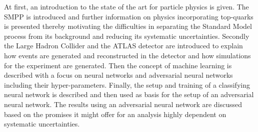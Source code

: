 At first, an introduction to the state of the art for particle physics is given. The SMPP is introduced and further information on physics incorporating top-quarks is presented thereby motivating the difficulties in separating the Standard Model process from its background and reducing its systematic uncertainties.
Secondly the Large Hadron Collider and the ATLAS detector are introduced to explain how events are generated and reconstructed in the detector and how simulations for the experiment are generated.
Then the concept of machine learning is described with a focus on neural networks and adversarial neural networks including their hyper-parameters.
Finally, the setup and training of a classifying neural network is described and then used as basis for the setup of an adversarial neural network.
The results using an adversarial neural network are discussed based on the promises it might offer for an analysis highly dependent on systematic uncertainties.




